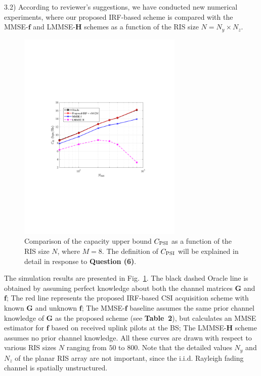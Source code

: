 \documentclass[a4paper,12pt]{article}
\begin{document}
{{3.2) According to reviewer's suggestions, we have conducted new numerical experiments, where our proposed IRF-based scheme is compared with the MMSE-$\bm f$ and LMMSE-$\bm H$ schemes as a function of the RIS size $N=N_y\times N_z$. 
\begin{figure}[h]
    \centering 
    \color{blue}
    \includegraphics[width=0.7\textwidth]{figs/C-wrt-N_RIS.pdf}
    \caption{Comparison of the capacity upper bound $C_{\rm PSI}$ as a function of the RIS size $N$, where $M=8$. The definition of $C_{\rm PSI}$ will be explained in detail in response to {\bf Question (6)}. }
    \label{fig:RIS_size}
\end{figure}

The simulation results are presented in {Fig.~\ref{fig:RIS_size}}. The black dashed Oracle line is obtained by assuming perfect knowledge about both the channel matrices $\bm G$ and $\bm f$; The red line represents the proposed IRF-based CSI acquisition scheme with known $\bm G$ and unknown $\bm f$; The MMSE-$\bm f$ baseline assumes the same prior channel knowledge of $\bm G$ as the proposed scheme (see {\bf Table~2}), but calculates an MMSE estimator for $\bm f$ based on received uplink pilots at the BS; The LMMSE-$\bm H$ scheme assumes no prior channel knowledge. All these curves are drawn with respect to various RIS sizes $N$ ranging from $50$ to $800$. Note that the detailed values $N_y$ and $N_z$ of the planar RIS array are not important, since the i.i.d. Rayleigh fading channel is spatially unstructured.  

}}
\end{document}
